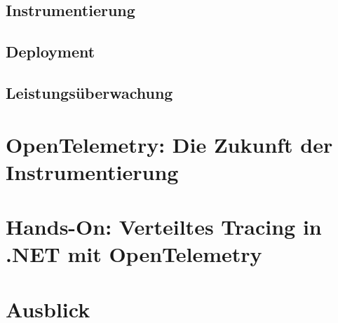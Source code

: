 \documentclass[a4paper,12p]{article}
\begin{document}
\subsection{Instrumentierung}

\subsection{Deployment}

\subsection{Leistungsüberwachung}

\section{OpenTelemetry: Die Zukunft der Instrumentierung}

\section{Hands-On: Verteiltes Tracing in .NET mit OpenTelemetry}

\section{Ausblick}








\end{document}
